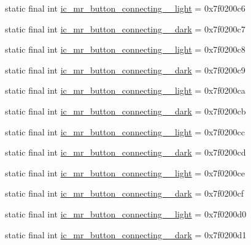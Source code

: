 \begin{CompactItemize}
\item 
static final int \hyperlink{classandroid_1_1support_1_1v7_1_1palette_1_1_r_1_1drawable_268d5172f1f293056493f69e45fb0a4d}{ic\_\-mr\_\-button\_\-connecting\_\_\-light} = 0x7f0200c6
\item 
static final int \hyperlink{classandroid_1_1support_1_1v7_1_1palette_1_1_r_1_1drawable_0b7aa5584682fb3bc34e54addfc8303f}{ic\_\-mr\_\-button\_\-connecting\_\_\-dark} = 0x7f0200c7
\item 
static final int \hyperlink{classandroid_1_1support_1_1v7_1_1palette_1_1_r_1_1drawable_291d5b0d4d0de54a4244b69e6c16aa17}{ic\_\-mr\_\-button\_\-connecting\_\_\-light} = 0x7f0200c8
\item 
static final int \hyperlink{classandroid_1_1support_1_1v7_1_1palette_1_1_r_1_1drawable_e17d8d4c39f0027f8a3d40580cd9a830}{ic\_\-mr\_\-button\_\-connecting\_\_\-dark} = 0x7f0200c9
\item 
static final int \hyperlink{classandroid_1_1support_1_1v7_1_1palette_1_1_r_1_1drawable_14421635ea7a2399d267ddf533badc85}{ic\_\-mr\_\-button\_\-connecting\_\_\-light} = 0x7f0200ca
\item 
static final int \hyperlink{classandroid_1_1support_1_1v7_1_1palette_1_1_r_1_1drawable_58b0f198b6b26f8258eae1101e8cf4e9}{ic\_\-mr\_\-button\_\-connecting\_\_\-dark} = 0x7f0200cb
\item 
static final int \hyperlink{classandroid_1_1support_1_1v7_1_1palette_1_1_r_1_1drawable_1a301497f6a04fae73790ea2951df0bc}{ic\_\-mr\_\-button\_\-connecting\_\_\-light} = 0x7f0200cc
\item 
static final int \hyperlink{classandroid_1_1support_1_1v7_1_1palette_1_1_r_1_1drawable_df545482b2ee5f8e49a2c702bd0d78df}{ic\_\-mr\_\-button\_\-connecting\_\_\-dark} = 0x7f0200cd
\item 
static final int \hyperlink{classandroid_1_1support_1_1v7_1_1palette_1_1_r_1_1drawable_72dafcc12e012eeb26918fbb4730b777}{ic\_\-mr\_\-button\_\-connecting\_\_\-light} = 0x7f0200ce
\item 
static final int \hyperlink{classandroid_1_1support_1_1v7_1_1palette_1_1_r_1_1drawable_590d3f4aa58573d7046bc8e8259fa35c}{ic\_\-mr\_\-button\_\-connecting\_\_\-dark} = 0x7f0200cf
\item 
static final int \hyperlink{classandroid_1_1support_1_1v7_1_1palette_1_1_r_1_1drawable_ca5cfcf976e672b6116bb71bbf0a5b6d}{ic\_\-mr\_\-button\_\-connecting\_\_\-light} = 0x7f0200d0
\item 
static final int \hyperlink{classandroid_1_1support_1_1v7_1_1palette_1_1_r_1_1drawable_faaa06453be5b04016e7fcffaa6adc60}{ic\_\-mr\_\-button\_\-connecting\_\_\-dark} = 0x7f0200d1

\end{CompactItemize}
